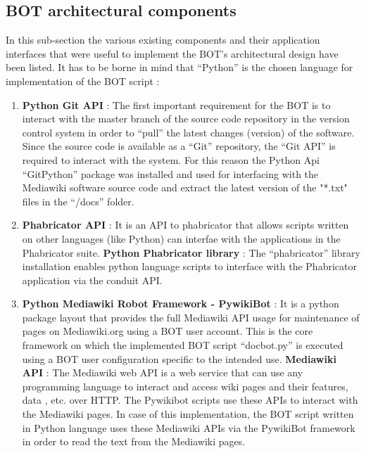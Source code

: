 \subsection{BOT architectural components}
In this sub-section the various existing components and their application interfaces that were useful to implement the BOT's architectural design have been listed. It has to be borne in mind that \enquote{Python} is the chosen language for implementation of the BOT script :
\begin{enumerate}
\item \textbf{Python Git API} \cite{git_py} : The first important requirement for the BOT is to interact with the master branch of the source code repository in the version control system in order to \enquote{pull} the latest changes (version) of the software. Since the source code is available as a \enquote{Git} repository, the \enquote{Git API} is required to interact with the system. For this reason the Python Api \enquote{GitPython} package was installed and used for interfacing with the Mediawiki software source code and extract the latest version of the "*.txt" files in the \enquote{/docs} folder.
\item \textbf{Phabricator API} \cite{phab_api} : It is an API to phabricator that allows scripts written on other languages (like Python) can interfae with the applications in the Phabricator suite.
\newline \textbf{Python Phabricator library} \cite{phab_py} : The \enquote{phabricator} library installation enables python language scripts to interface with the Phabricator application via the conduit API. 
\item \textbf{Python Mediawiki Robot Framework - PywikiBot} \cite{manual_pwb} : It is a python package layout that provides the full Mediawiki API usage for maintenance of pages on Mediawiki.org using a BOT user account. This is the core framework on which the implemented BOT script \enquote{docbot.py} is executed using a BOT user configuration specific to the intended use.
\newline \textbf{Mediawiki API} \cite{mw_api} : The Mediawiki web API is a web service that can use any programming language to interact and access wiki pages and their features, data , etc. over HTTP. The Pywikibot scripts use these APIs to interact with the Mediawiki pages. In case of this implementation, the BOT script written in Python language uses these Mediawiki APIs via the PywikiBot framework in order to read the text from the Mediawiki pages. 
\end{enumerate}



